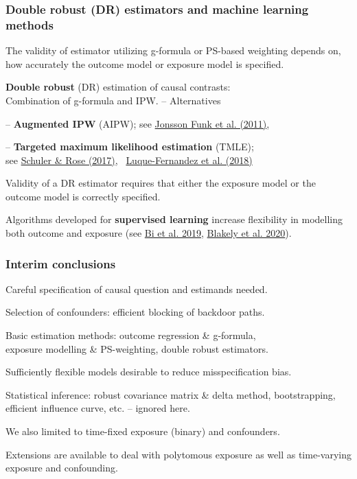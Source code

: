 \documentclass[12pt,dvipsnames,t,aspectratio=169, handout%
]{beamer}
\begin{document}
\begin{frame}
\frametitle{Double robust (DR) estimators and machine learning methods}
\bi
\item
The validity of estimator utilizing g-formula or PS-based weighting depends on, how accurately
the outcome model or exposure model is specified.
\medskip
\item
{\bf Double robust} (DR) estimation 
of causal contrasts: \\
Combination of g-formula and IPW. -- Alternatives
\bi
{\normalsize
\item[--]
 {\bf Augmented IPW} (AIPW); {\small see \href{https://doi.org/10.1093/aje/kwq439}{\color{blue}Jonsson Funk et al. (2011)}},\\
\medskip
\item[--] {\bf Targeted maximum likelihood estimation} (TMLE); \\ 
 {\small see \href{https://doi.org/10.1093/aje/kww165}{\color{blue}Schuler \& Rose (2017)}, \
             \href{https://doi.org/10.1002/sim.7628}{\color{blue}Luque-Fernandez et al. (2018)}} 
}
\ei
Validity of a DR estimator requires that either the exposure model or the outcome model
is correctly specified.
\medskip
\item Algorithms developed for {\bf supervised learning} 
increase flexibility in modelling both outcome and exposure 
{\small (see \href{https://doi.org/10.1093/aje/kwz189}{\color{blue}Bi et al. 2019}, 
\href{https://doi.org/10.1093/ije/dyz132}{\color{blue}Blakely et al. 2020})}.
\ei 
\end{frame}




\begin{frame}
\frametitle{\large Interim conclusions}

\bi
\item 
Careful specification of causal question and estimands needed.
\medskip
\item 
Selection of confounders: efficient blocking of backdoor paths.
\medskip
\item
Basic estimation methods: outcome regression \& g-formula, \\ 
exposure modelling \& PS-weighting,
 double robust estimators.
\medskip
\item
Sufficiently flexible models desirable to reduce misspecification bias. 
\medskip
\item 
Statistical inference: robust covariance matrix \& delta method, bootstrapping,
efficient influence curve, etc. -- ignored here. 
\medskip
\item
We also limited to time-fixed exposure (binary) and confounders.
\medskip
\item
Extensions are available to deal with
 polytomous exposure as well as time-varying exposure and confounding.
\ei

\end{frame}
\end{document}
